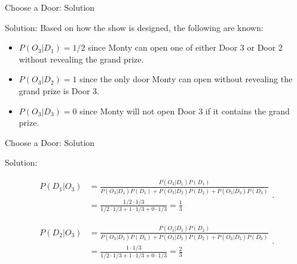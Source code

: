 \documentclass[
  ignorenonframetext,
]{beamer}
\begin{document}
\begin{frame}{Choose a Door: Solution}
\protect\hypertarget{choose-a-door-solution-1}{}
\begin{tcolorbox}
Solution: Based on how the show is designed, the following are known:

\begin{itemize}
\item  $P(O_3|D_1)=1/2$ since Monty can open one of either Door 3 or Door 2 without revealing the grand prize.

\item $P(O_3|D_2)=1$ since the only door Monty can open without revealing the grand prize is Door 3.

\item $P(O_3|D_3)=0$ since Monty will not open Door 3 if it contains the grand prize. 
\end{itemize}
\end{tcolorbox}
\end{frame}

\begin{frame}{Choose a Door: Solution}
\protect\hypertarget{choose-a-door-solution-2}{}
\begin{tcolorbox}
Solution: 

$$\begin{array}{ll}P(D_1|O_3)&=\frac{P(O_3|D_1)P(D_1)}{P(O_3|D_1)P(D_1)+P(O_3|D_2)P(D_2)+P(O_3|D_3)P(D_3)}\\
&=\frac{1/2 \cdot 1/3}{1/2 \cdot 1/3+1\cdot 1/3+0 \cdot 1/3}=\frac{1}{3}\end{array}.$$


$$\begin{array}{ll}
P(D_2|O_3)&=\frac{P(O_3|D_2)P(D_2)}{P(O_3|D_1)P(D_1)+P(O_3|D_2)P(D_2)+P(O_3|D_3)P(D_3)}\\
&=\frac{1 \cdot 1/3}{1/2 \cdot 1/3+1\cdot 1/3+0 \cdot 1/3}=\frac{2}{3}\end{array}.$$

\end{tcolorbox}
\end{frame}
\end{document}

